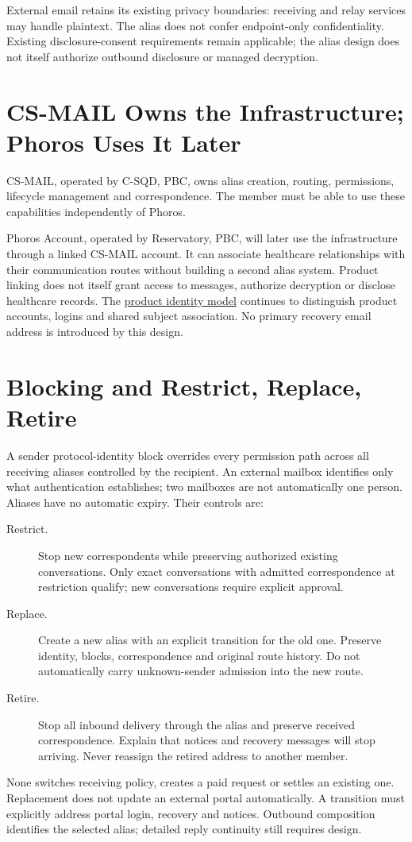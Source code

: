 \documentclass[11pt]{article}
\begin{document}
External email retains its existing privacy boundaries: receiving and relay
services may handle plaintext. The alias does not confer endpoint-only
confidentiality. Existing disclosure-consent requirements remain applicable;
the alias design does not itself authorize outbound disclosure or managed decryption.

\section{CS-MAIL Owns the Infrastructure; Phoros Uses It Later}

CS-MAIL, operated by C-SQD, PBC, owns alias creation, routing, permissions,
lifecycle management and correspondence. The member must be able to use these
capabilities independently of Phoros.

Phoros Account, operated by Reservatory, PBC, will later use the infrastructure
through a linked CS-MAIL account. It can associate healthcare relationships with
their communication routes without building a second alias system. Product
linking does not itself grant access to messages, authorize decryption or disclose
healthcare records. The \href{docs/product-identity-model.md}{product identity
model} continues to distinguish product accounts, logins and shared subject
association. No primary recovery email address is introduced by this design.

\section{Blocking and Restrict, Replace, Retire}

A sender protocol-identity block overrides every permission path across all
receiving aliases controlled by the recipient. An external mailbox identifies
only what authentication establishes; two mailboxes are not automatically one
person. Aliases have no automatic expiry. Their controls are:
\begin{description}
  \item[Restrict.] Stop new correspondents while preserving authorized existing
  conversations. Only exact conversations with admitted correspondence at restriction qualify; new conversations require explicit approval.
  \item[Replace.] Create a new alias with an explicit transition for the old one.
  Preserve identity, blocks, correspondence and original route history. Do not
  automatically carry unknown-sender admission into the new route.
  \item[Retire.] Stop all inbound delivery through the alias and preserve received
  correspondence. Explain that notices and recovery messages will stop arriving.
  Never reassign the retired address to another member.
\end{description}
None switches receiving policy, creates a paid request or settles an existing one. Replacement
does not update an external portal automatically. A transition must explicitly
address portal login, recovery and notices. Outbound composition identifies the
selected alias; detailed reply continuity still requires design.
\end{document}
